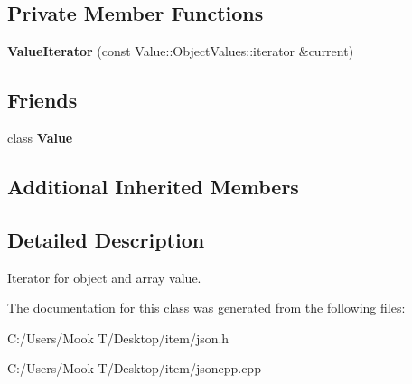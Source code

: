 \subsection*{Private Member Functions}
\begin{DoxyCompactItemize}
\item 
\hypertarget{class_json_1_1_value_iterator_afb06ea21add440c78c27dc49570460a5}{}{\bfseries Value\+Iterator} (const Value\+::\+Object\+Values\+::iterator \&current)\label{class_json_1_1_value_iterator_afb06ea21add440c78c27dc49570460a5}

\end{DoxyCompactItemize}
\subsection*{Friends}
\begin{DoxyCompactItemize}
\item 
\hypertarget{class_json_1_1_value_iterator_aeceedf6e1a7d48a588516ce2b1983d6f}{}class {\bfseries Value}\label{class_json_1_1_value_iterator_aeceedf6e1a7d48a588516ce2b1983d6f}

\end{DoxyCompactItemize}
\subsection*{Additional Inherited Members}


\subsection{Detailed Description}
Iterator for object and array value. 

The documentation for this class was generated from the following files\+:\begin{DoxyCompactItemize}
\item 
C\+:/\+Users/\+Mook T/\+Desktop/item/json.\+h\item 
C\+:/\+Users/\+Mook T/\+Desktop/item/jsoncpp.\+cpp\end{DoxyCompactItemize}
